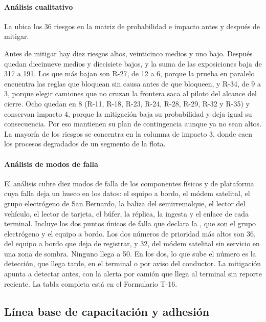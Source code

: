 \paragraph{Análisis cualitativo}
La  ubica los 36 riesgos en la matriz de probabilidad e impacto antes y después de
mitigar.


Antes de mitigar hay diez riesgos altos, veinticinco medios y uno bajo. Después quedan diecinueve
medios y diecisiete bajos, y la suma de las exposiciones baja de 317 a 191. Los que más bajan son R-27, de
12 a 6, porque la prueba en paralelo encuentra las reglas que bloquean sin causa antes de que bloqueen, y
R-34, de 9 a 3, porque elegir camiones que no cruzan la frontera saca al piloto del alcance del cierre.
Ocho quedan en 8 (R-11, R-18, R-23, R-24, R-28, R-29, R-32 y R-35) y conservan impacto 4, porque la
mitigación baja su probabilidad y deja igual su consecuencia. Por eso mantienen su plan de contingencia aunque ya no sean altos. La mayoría de los
riesgos se concentra en la columna de impacto 3, donde caen los procesos degradados de un segmento de la
flota.

\paragraph{Análisis de modos de falla}
El análisis cubre diez modos de falla de los componentes físicos y de plataforma cuya falla deja un hueco
en los datos: el equipo a bordo, el módem satelital, el grupo electrógeno de San Bernardo, la baliza del
semirremolque, el lector del vehículo, el lector de tarjeta, el búfer, la réplica, la ingesta y el enlace
de cada terminal. Incluye los dos puntos únicos de falla que declara la , que
son el grupo electrógeno y el equipo a bordo. Los dos números de prioridad más altos son 36, del equipo a
bordo que deja de registrar, y 32, del módem satelital sin servicio en una zona de sombra. Ninguno llega
a 50. En los dos, lo que sube el número es la detección, que llega tarde, en el terminal o por aviso del
conductor. La mitigación apunta a detectar antes, con la alerta por camión que llega
al terminal sin reporte reciente. La tabla completa está en el Formulario T-16.

\subsection{Línea base de capacitación y adhesión}\label{sec:8-acuerdo-capacitacion-adhesion}

